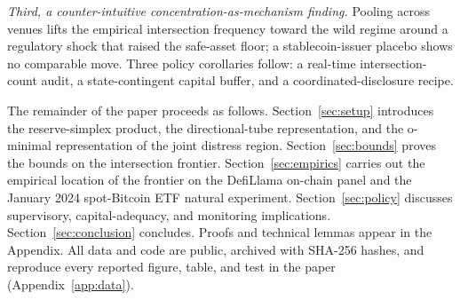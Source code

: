 \documentclass[12pt]{article}
\theoremstyle{sampledef}
\theoremstyle{sampleplain}
\theoremstyle{sampleremark}
\newcommand{\1}{\mathbf{1}}
\begin{document}
\emph{Third, a counter-intuitive concentration-as-mechanism
finding.} Pooling across venues lifts the empirical intersection
frequency toward the wild regime around a regulatory shock that
raised the safe-asset floor; a stablecoin-issuer placebo shows no
comparable move. Three policy corollaries follow: a real-time
intersection-count audit, a state-contingent capital buffer, and
a coordinated-disclosure recipe.

The remainder of the paper proceeds as follows. Section~\ref{sec:setup}
introduces the reserve-simplex product, the directional-tube
representation, and the o-minimal representation of the joint
distress region. Section~\ref{sec:bounds} proves the bounds on the
intersection frontier. Section~\ref{sec:empirics} carries out the
empirical location of the frontier on the DefiLlama on-chain panel
and the January 2024 spot-Bitcoin ETF natural experiment.
Section~\ref{sec:policy} discusses supervisory, capital-adequacy,
and monitoring implications. Section~\ref{sec:conclusion} concludes.
Proofs and technical lemmas appear in the Appendix. All data and code
are public, archived with SHA-256 hashes, and reproduce every reported
figure, table, and test in the paper (Appendix~\ref{app:data}).

\end{document}
